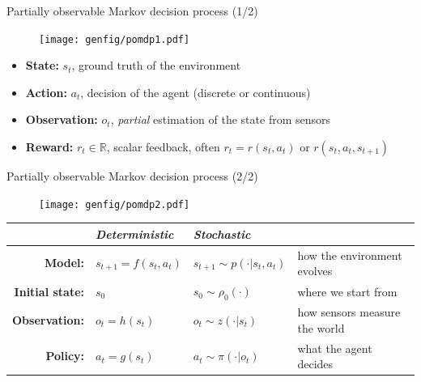 \documentclass[10pt, aspectratio=1610]{beamer}
\begin{document}
\begin{frame}{Partially observable Markov decision process (1/2)}
    \begin{figure}
        \texttt{[image: genfig/pomdp1.pdf]}
    \end{figure}
    \begin{itemize}
        \item \textbf{State:} $s_t$, ground truth of the environment
        \item \textbf{Action:} $a_t$, decision of the agent (discrete or continuous)
        \item \textbf{Observation:} $o_t$, \emph{partial} estimation of the state from sensors
        \item \textbf{Reward:} $r_t \in \mathbb{R}$, scalar feedback, often $r_t = r(s_t, a_t)$ or $r(s_t, a_t, s_{t+1})$
    \end{itemize}
    \vspace{-1em}
\end{frame}

\begin{frame}{Partially observable Markov decision process (2/2)}
    \begin{figure}
        \texttt{[image: genfig/pomdp2.pdf]}
    \end{figure}
    \begin{table}
        \begin{tabular}{rlll}
            & \emph{Deterministic} & \emph{Stochastic} \\
            \hline
            \textbf{Model:} & $s_{t+1} = f(s_t, a_t)$ & $s_{t+1} \sim p(\cdot | s_t, a_t)$ & how the environment evolves \\
            \textbf{Initial state:} & $s_0$ & $s_0 \sim \rho_0(\cdot)$ & where we start from \\
            \textbf{Observation:} & $o_t = h(s_t)$ & $o_t \sim z(\cdot | s_t)$ & how sensors measure the world \\  %
            \textbf{Policy:} & $a_t = g(s_t)$ & $a_t \sim \pi(\cdot | o_t)$ & what the agent decides
        \end{tabular}
    \end{table}
\end{frame}
\end{document}
